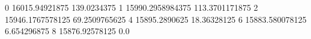 0 16015.94921875 139.0234375
1 15990.2958984375 113.3701171875
2 15946.1767578125 69.2509765625
4 15895.2890625 18.36328125
6 15883.580078125 6.654296875
8 15876.92578125 0.0
